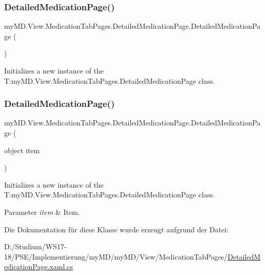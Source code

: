 \subsubsection{\texorpdfstring{Detailed\+Medication\+Page()}{DetailedMedicationPage()}\hspace{0.1cm}{\footnotesize\ttfamily [1/2]}}
{\footnotesize\ttfamily my\+M\+D.\+View.\+Medication\+Tab\+Pages.\+Detailed\+Medication\+Page.\+Detailed\+Medication\+Page (\begin{DoxyParamCaption}{ }\end{DoxyParamCaption})}



Initializes a new instance of the T\+:my\+M\+D.\+View.\+Medication\+Tab\+Pages.\+Detailed\+Medication\+Page class. 

\mbox{\label{classmy_m_d_1_1_view_1_1_medication_tab_pages_1_1_detailed_medication_page_a85fb3c6227ab81ef9b263263d76726b9}} 
\subsubsection{\texorpdfstring{Detailed\+Medication\+Page()}{DetailedMedicationPage()}\hspace{0.1cm}{\footnotesize\ttfamily [2/2]}}
{\footnotesize\ttfamily my\+M\+D.\+View.\+Medication\+Tab\+Pages.\+Detailed\+Medication\+Page.\+Detailed\+Medication\+Page (\begin{DoxyParamCaption}\item[{object}]{item }\end{DoxyParamCaption})}



Initializes a new instance of the T\+:my\+M\+D.\+View.\+Medication\+Tab\+Pages.\+Detailed\+Medication\+Page class. 


\begin{DoxyParams}{Parameter}
{\em item} & Item.\\
\hline
\end{DoxyParams}


Die Dokumentation für diese Klasse wurde erzeugt aufgrund der Datei\+:\begin{DoxyCompactItemize}
\item 
D\+:/\+Studium/\+W\+S17-\/18/\+P\+S\+E/\+Implementierung/my\+M\+D/my\+M\+D/\+View/\+Medication\+Tab\+Pages/\mbox{\hyperlink{_detailed_medication_page_8xaml_8cs}{Detailed\+Medication\+Page.\+xaml.\+cs}}\end{DoxyCompactItemize}
